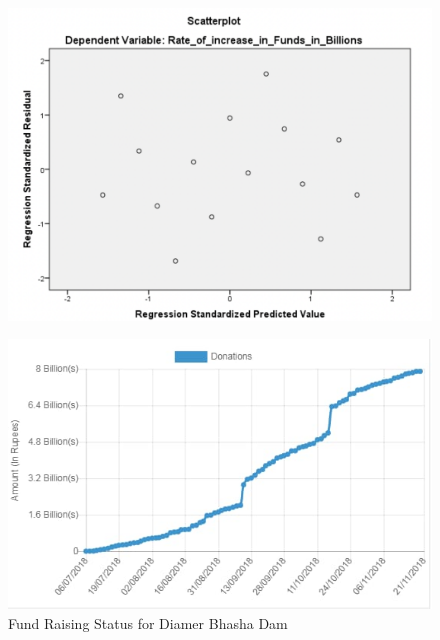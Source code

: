 \documentclass[11pt, journal,letterpaper,compsoc]{IEEEtran}
\begin{document}
\begin{figure}  [h!]
\includegraphics[width=\linewidth]{images/scatterplot}
\end{figure}




\begin{figure}  [h!]
\includegraphics[width=\linewidth]{images/fund-status}
 \caption{Fund Raising Status for Diamer Bhasha Dam}
\end{figure}
\end{document}
